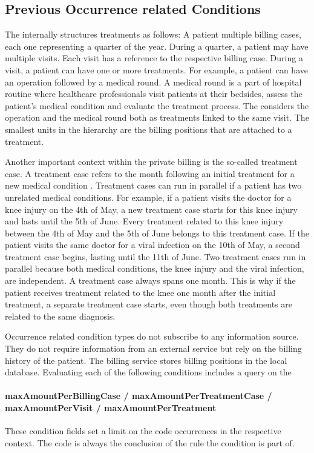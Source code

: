 \subsection{Previous Occurrence related Conditions}\label{subsec:previous-occurrence-related}

The \AVS internally structures treatments as follows:
A patient multiple billing cases, each one representing a quarter of the year.
During a quarter, a patient may have multiple visits.
Each visit has a reference to the respective billing case.
During a visit, a patient can have one or more treatments.
For example, a patient can have an operation followed by a medical round.
A medical round is a part of hospital routine where healthcare professionals visit patients at their bedsides,
assess the patient's medical condition and evaluate the treatment process.
The \AVS considers the operation and the medical round both as treatments linked to the same visit.
The smallest units in the hierarchy are the billing positions that are attached to a treatment.

Another important context within the private billing is the so-called treatment case.
A treatment case refers to the month following an initial treatment for a new medical condition \cite{bruck1998kommentar}.
Treatment cases can run in parallel if a patient has two unrelated medical conditions.
For example, if a patient visits the doctor for a knee injury on the 4th of May, a new treatment case starts for this knee injury and lasts until the 5th of June.
Every treatment related to this knee injury between the 4th of May and the 5th of June belongs to this treatment case.
If the patient visits the same doctor for a viral infection on the 10th of May, a second treatment case begins, lasting until the 11th of June.
Two treatment cases run in parallel because both medical conditions, the knee injury and the viral infection, are independent.
A treatment case always spans one month.
This is why if the patient receives treatment related to the knee one month after the initial treatment, a separate treatment case starts, even though both treatments are related to the same diagnosis.

Occurrence related condition types do not subscribe to any information source.
They do not require information from an external service but rely on the billing history of the patient.
The billing service stores billing positions in the local database.
Evaluating each of the following conditions includes a query on the

\paragraph{maxAmountPerBillingCase / maxAmountPerTreatmentCase / maxAmountPerVisit / maxAmountPerTreatment}
These condition fields set a limit on the code occurrences in the respective context.
The code is always the conclusion of the rule the condition is part of.


